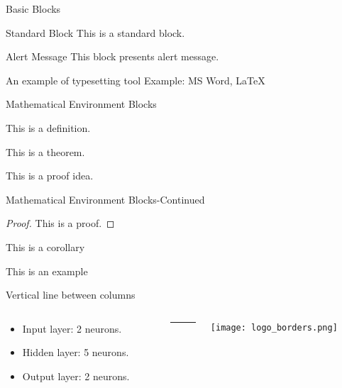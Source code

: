 \documentclass{beamer}
\begin{document}
\begin{frame}{Basic Blocks}
	\begin{block}{Standard Block}
		This is a standard block.
	\end{block}
	\begin{alertblock}{Alert Message}
		This block presents alert message.
	\end{alertblock}
	\begin{exampleblock}{An example of typesetting tool}
		Example: MS Word, \LaTeX{}
	\end{exampleblock}
\end{frame}
\begin{frame}{Mathematical Environment Blocks}
	\begin{definition}
		This is a definition.
	\end{definition}

	\begin{theorem}
		This is a theorem.
	\end{theorem}

	\begin{lemma}
		This is a proof idea.
	\end{lemma}
\end{frame}
\begin{frame}{Mathematical Environment Blocks-Continued}
	\begin{proof}
		This is a proof.
	\end{proof}

	\begin{corollary}
		This is a corollary
	\end{corollary}

	\begin{example}
		This is an example
	\end{example}
\end{frame}




\begin{frame}{Vertical line between columns}

	\begin{columns}[T]%
		\begin{column}{0.49\textwidth}

			\begin{itemize}
				\item Input layer: 2 neurons.
				\item Hidden layer: 5 neurons.
				\item Output layer: 2 neurons.
			\end{itemize}

		\end{column}
		\begin{column}{.02\textwidth}
			\rule{.1mm}{0.7\textheight}
		\end{column}
		\begin{column}{0.49\textwidth}
			\texttt{[image: logo\_borders.png]}
		\end{column}

	\end{columns}
\end{frame}
\end{document}
